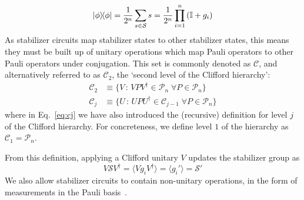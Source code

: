 \begin{equation}
    \ketbra{\phi} = \frac{1}{2^{n}}\sum_{s\in\mathcal{S}} s = \frac{1}{2^{n}}\prod_{i=1}^{n}\left(\mathbb{I}+g_{i}\right)
\end{equation}
As stabilizer circuits map stabilizer states to other stabilizer states, this means they must be built up of unitary operations which map Pauli operators to other Pauli operators under conjugation. This set is commonly denoted as $\mathcal{C}$, and alternatively referred to as $\mathcal{C}_{2}$, the `second level of the Clifford hierarchy':
\begin{align}
    \mathcal{C}_{2} &\equiv \{V\,:\,VPV^{\dagger}\in\mathcal{P}_{n}\;\forall P\in\mathcal{P}_{n}\} \label{eq:c2}\\
    \mathcal{C}_{j} &\equiv \{U\,:\,UPU^{\dagger}\in\mathcal{C}_{j-1}\;\forall P\in\mathcal{P}_{n}\} \label{eq:cj}
\end{align}
where in Eq.~\ref{eq:cj} we have also introduced the (recursive) definition for level $j$ of the Clifford hierarchy. For concreteness, we define level $1$ of the hierarchy as $\mathcal{C}_{1}=\mathcal{P}_{n}$.\par
From this definition, applying a Clifford unitary $V$ updates the stabilizer group as
\begin{equation}
    V\mathcal{S}V^{\dagger}=\langle Vg_{i}V^{\dagger}\rangle = \langle g_{i}' \rangle = \mathcal{S}'
\end{equation}
We also allow stabilizer circuits to contain non-unitary operations, in the form of measurements in the Pauli basis~\cite{Gottesman1998b}.
